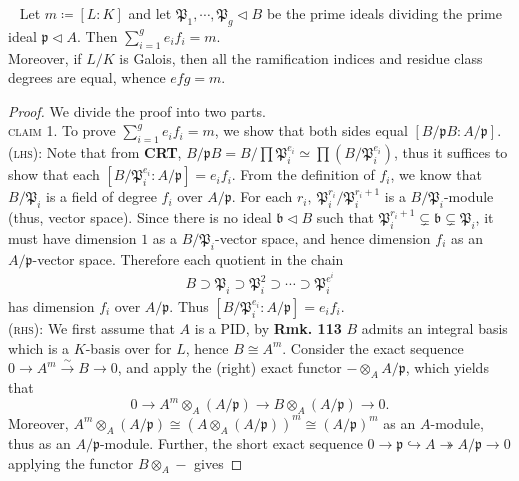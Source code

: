 \documentclass[12pt,a4paper,footinclude=true,headinclude=true]{scrbook} %
\newenvironment{theorem}[2][]
{\renewcommand\theinnercustomthm{#2}\innercustomthm[#1]
\begin{mdframed}[backgroundcolor=yellow!20]\ }
{\end{mdframed}\endinnercustomthm}
\begin{document}
\begin{theorem}{158}
    Let $m\coloneqq[L:K]$ and let $\mathfrak{P}_1,\cdots,\mathfrak{P}_g \triangleleft B$ be the prime ideals dividing the prime ideal $\mathfrak{p}\triangleleft A$. Then $\sum_{i=1}^ge_if_i=m$.\\
    Moreover, if $L/K$ is Galois, then all the ramification indices and residue class degrees are equal, whence $efg=m$.
\end{theorem}
\begin{proof}
    We divide the proof into two parts.\\
    \textsc{claim 1.} To prove $\sum_{i=1}^ge_if_i=m$, we show that both sides equal $[B/\mathfrak{p}B:A/\mathfrak{p}]$.\\
    \textsc{(lhs):} Note that from \textbf{CRT}, $B/\mathfrak{p}B=B/ \prod\mathfrak{P}_i^{e_i}\simeq\prod(B/\mathfrak{P}_i^{e_i})$, thus it suffices to show that each $[B/\mathfrak{P}_i^{e_i}:A/\mathfrak{p}]= e_if_i$. From the definition of $f_i$, we know that $B/\mathfrak{P}_i$ is a field of degree $f_i$ over $A/\mathfrak{p}$. For each $r_i,\ \mathfrak{P}_i^{r_i}/\mathfrak{P}_i^{r_i+1}$ is a $B/\mathfrak{P}_i$-module (thus, vector space). Since there is no ideal $\mathfrak{b}\triangleleft B$ such that $\mathfrak{P}_i^{r_i+1}\subsetneq\mathfrak{b} \subsetneq\mathfrak{P}_i$,  it must have dimension $1$ as a $B/\mathfrak{P}_i$-vector space, and hence dimension $f_i$ as an $A/\mathfrak{p}$-vector space. Therefore each quotient in the chain 
    \begin{align*}
        B\supset\mathfrak{P}_i\supset\mathfrak{P}_i^2\supset\cdots\supset \mathfrak{P}_i^{e^i}
    \end{align*}
    has dimension $f_i$ over $A/\mathfrak{p}$. Thus $[B/\mathfrak{P}_i^{e_i}:A/\mathfrak{p}]= e_if_i$.\\
    \textsc{(rhs):} We first assume that $A$ is a PID, by \textbf{Rmk. 113} $B$ admits an integral basis which is a $K$-basis over for $L$, hence $B\cong A^m$. Consider the exact sequence $0\to A^m\xrightarrow{\sim} B\to0$, and apply the (right) exact functor $-\otimes_AA/\mathfrak{p}$, which yields that 
    \begin{equation*}
        0 \longrightarrow A^m\otimes_A(A/\mathfrak{p})\longrightarrow B\otimes_A(A/\mathfrak{p})\longrightarrow0.
    \end{equation*}
    Moreover, $A^m\otimes_A(A/\mathfrak{p})\cong(A\otimes_A(A/\mathfrak{p}))^m\cong(A/\mathfrak{p})^m$ as an $A$-module, thus as an $A/\mathfrak{p}$-module. Further, the short exact sequence $0\to\mathfrak{p}\hookrightarrow A\twoheadrightarrow A/\mathfrak{p}\to 0$ applying the functor $B\otimes_A-$ gives 

\end{proof}
\end{document}
